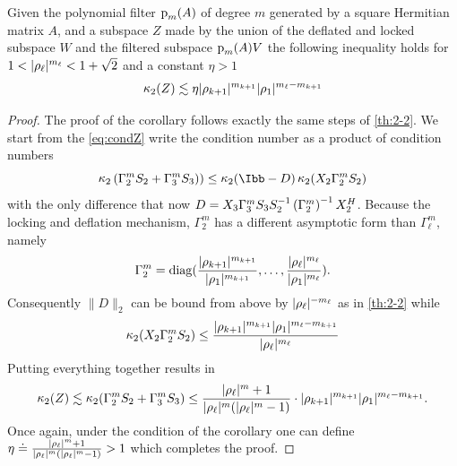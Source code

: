 \begin{corollary}
\label{cr:3-1}
Given the polynomial filter ${\textrm p}_{m} (A)$ of degree $m$ generated by a square Hermitian matrix $A$, and a subspace $Z$ made by the union of the deflated and locked subspace $W$ and the filtered subspace ${\textrm p}_{m} (A)V$  the following inequality holds for $1 < |\rho_{\ell}|^{m_\ell} < 1 + \sqrt{2}$ and a constant $\eta > 1$ 
\begin{equation}
\mathop\mathrm{\kappa}_2\nolimits (Z) \lesssim \eta |\rho_{k+1}|^{m_{k+1}} |\rho_{1}|^{m_\ell-m_{k+1}}
\end{equation}
\end{corollary}
\begin{proof}
The proof of the corollary follows exactly the same steps of \cref{th:2-2}. We start from the \eqref{eq:condZ} write the condition number as a product of condition numbers
\[
\cd \left(\Gamma_2^m S_2 + \Gamma_3^m S_3)\right) \leq \cd (\Ibb - D) \cd (X_2 \Gamma_2^m S_2)
\]
with the only difference that now $D = X_3 \Gamma_3^m S_3 S_2^{-1} \left(\Gamma_2^m\right)^{-1} X_2^H$. Because the locking and deflation mechanism, $\Gamma_2^m$ has a different asymptotic form than $\Gamma_\ell^m$, namely
\[
\Gamma_2^{m}  = \mathop\mathrm{diag}\nolimits (\frac{|\rho_{k+1}|^{m_{k+1}}}{|\rho_{1}|^{m_{k+1}}}, \dots, \frac{|\rho_{\ell}|^{m_\ell}}{|\rho_{1}|^{m_\ell}}).
\]
Consequently $\|D\|_2$ can be bound from above by $|\rho_{\ell}|^{-m_\ell}$ as in \ref{th:2-2} while  \[
\mathop\mathrm{\kappa}_2\nolimits (X_2 \Gamma_2^m S_2) \leq \frac{|\rho_{k+1}|^{m_{k+1}} |\rho_{1}|^{m_\ell - m_{k+1}}}{|\rho_{\ell}|^{m_\ell}}
\]
Putting everything together results in
\begin{equation}
    \mathop\mathrm{\kappa}_2\nolimits (Z) \lesssim \mathop\mathrm{\kappa}_2\nolimits (\Gamma_2^m S_2 + \Gamma_3^m S_3) \leq \frac{|\rho_{\ell}|^{m} + 1}{|\rho_{\ell}|^{m}(|\rho_{\ell}|^{m} -1)} \cdot  |\rho_{k+1}|^{m_{k+1}} |\rho_{1}|^{m_\ell - m_{k+1}}.
\end{equation}
Once again, under the condition of the corollary one can define $\eta \doteq \frac{|\rho_{\ell}|^{m} + 1}{|\rho_{\ell}|^{m} (|\rho_{\ell}|^{m} -1)} > 1$ which completes the proof.
\end{proof}
